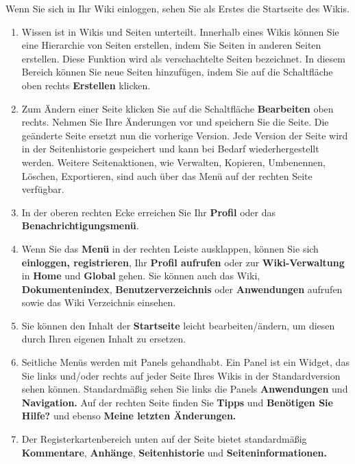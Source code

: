 \documentclass[
  letterpaper,
  DIV=11,
  numbers=noendperiod]{scrreprt}
\providecommand{\tightlist}{%
  \setlength{\itemsep}{0pt}\setlength{\parskip}{0pt}}\usepackage{longtable,booktabs,array}
\begin{document}
Wenn Sie sich in Ihr Wiki einloggen, sehen Sie als Erstes die Startseite
des Wikis.

\begin{enumerate}
\def\labelenumi{\arabic{enumi}.}
\tightlist
\item
  Wissen ist in Wikis und Seiten unterteilt. Innerhalb eines Wikis
  können Sie eine Hierarchie von Seiten erstellen, indem Sie Seiten in
  anderen Seiten erstellen. Diese Funktion wird als verschachtelte
  Seiten bezeichnet. In diesem Bereich können Sie neue Seiten
  hinzufügen, indem Sie auf die Schaltfläche oben rechts
  \textbf{Erstellen} klicken.
\item
  Zum Ändern einer Seite klicken Sie auf die Schaltfläche
  \textbf{Bearbeiten} oben rechts. Nehmen Sie Ihre Änderungen vor und
  speichern Sie die Seite. Die geänderte Seite ersetzt nun die vorherige
  Version. Jede Version der Seite wird in der Seitenhistorie gespeichert
  und kann bei Bedarf wiederhergestellt werden. Weitere Seitenaktionen,
  wie Verwalten, Kopieren, Umbenennen, Löschen, Exportieren, sind auch
  über das Menü auf der rechten Seite verfügbar.
\item
  In der oberen rechten Ecke erreichen Sie Ihr \textbf{Profil} oder das
  \textbf{Benachrichtigungsmenü}.
\item
  Wenn Sie das \textbf{Menü} in der rechten Leiste ausklappen, können
  Sie sich \textbf{einloggen, registrieren}, Ihr \textbf{Profil
  aufrufen} oder zur \textbf{Wiki-Verwaltung} in \textbf{Home} und
  \textbf{Global} gehen. Sie können auch das Wiki,
  \textbf{Dokumentenindex}, \textbf{Benutzerverzeichnis} oder
  \textbf{Anwendungen} aufrufen sowie das Wiki Verzeichnis einsehen.
\item
  Sie können den Inhalt der \textbf{Startseite} leicht
  bearbeiten/ändern, um diesen durch Ihren eigenen Inhalt zu ersetzen.
\item
  Seitliche Menüs werden mit Panels gehandhabt. Ein Panel ist ein
  Widget, das Sie links und/oder rechts auf jeder Seite Ihres Wikis in
  der Standardversion sehen können. Standardmäßig sehen Sie links die
  Panels \textbf{Anwendungen} und \textbf{Navigation.} Auf der rechten
  Seite finden Sie \textbf{Tipps} und \textbf{Benötigen Sie Hilfe?} und
  ebenso \textbf{Meine letzten Änderungen.}
\item
  Der Registerkartenbereich unten auf der Seite bietet standardmäßig
  \textbf{Kommentare}, \textbf{Anhänge}, \textbf{Seitenhistorie} und
  \textbf{Seiteninformationen.}
\end{enumerate}
\end{document}
